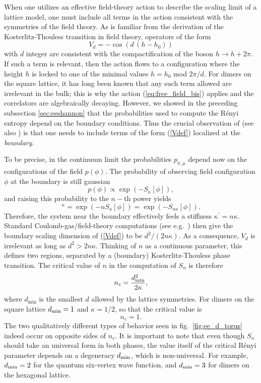 \documentclass[11pt]{iopart}
\begin{document}
When one utilizes an effective field-theory action to describe the scaling limit of a lattice model, one must include all terms in the action consistent with the symmetries of the field theory. As is familiar from the derivation of the Kosterlitz-Thouless transition in field theory, operators of the form 
\begin{equation}
 V_d=-\cos \left(d \,(h-h_0)\right)
 \label{Vdef}
\end{equation}
with $d$ integer 
are consistent with the compactification  of the boson $h\to h + 2\pi$.
If such a term is relevant, then the action flows to a configuration where the height $h$ is locked to one of the minimal values $h=h_0$ mod $2\pi/d$. For dimers on the square lattice, it has long been known that any such term allowed are irrelevant in the bulk; this is why the action (\ref{eq:free_field_bis}) applies and the correlators are algebraically decaying. However, we showed in the preceding subsection \ref{sec:eeshannon} that the probabilities used to compute the R\'enyi entropy depend on the boundary conditions. Thus the crucial observation of \cite{Stephan2011} (see also \cite{Shannonee}) is that one needs to include terms of the form (\ref{Vdef}) localized at the {\em boundary}.

To be precise, in the continuum limit the probabilities $p_{\sigma,\mu}$ depend now on the configurations of the field $p(\phi)$. The probability of observing field configuration $\phi$ at the boundary is still gaussian
\begin{equation}
 p(\phi)\propto \exp(-S_{\kappa}[\phi]),
\end{equation}
and raising this probability to the $n-$th power yields
\begin{equation}
 [p(\phi)]^n=\exp(-n S_{\kappa}[\phi])=\exp(-S_{n\kappa}[\phi]).
\end{equation}
Therefore, the system near the boundary effectively feels a stiffness $\kappa^\prime=n\kappa$. 
Standard Coulomb-gas/field-theory computations (see e.g.\ \cite{Ginsparg,Nienhuis}) then give the boundary scaling dimension of (\ref{Vdef}) to be $d^2/(2n\kappa)$. 
As a consequence, $V_d$ is irrelevant as long as $d^2>2n\kappa$. Thinking of $n$ as a continuous parameter, this defines two regions, separated by a (boundary) Kosterlitz-Thouless phase transition. The critical value of $n$ in the computation of  $S_n$  is therefore
\begin{equation}
 n_c=\frac{d_{\rm min}^2}{2\kappa},
\end{equation}
where $d_{\min}$ is the smallest $d$ allowed by the lattice symmetries. For dimers on the square lattice $d_{\rm min}=1$ and $\kappa=1/2$, so that the critical value is
\begin{equation}
 n_c=1.
\end{equation}
The two qualitatively different types of behavior seen in fig.\ \ref{fig:ee_d_torus} indeed occur on opposite sides of $n_c$. It is important to note that even though $S_n$ should take an universal form in both phases, the value itself of the critical R\'enyi parameter depends on a degeneracy $d_{\rm min}$, which is non-universal. For example, $d_{\rm min}=2$ for the quantum six-vertex wave function, and $d_{\rm min}=3$ for dimers on the hexagonal lattice. 
\end{document}
